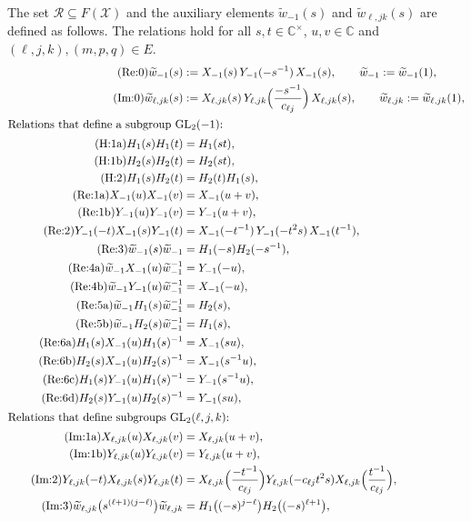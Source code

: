 \documentclass[11pt]{article}
\theoremstyle{definition}
\theoremstyle{remark}
\newcommand{\cX}{\mathcal{X}}
\newcommand{\cR}{\mathcal{R}}
\newcommand{\C}{\mathbb{C}}
\newcommand{\wt}{\widetilde{w}}
\begin{document}
The set $\cR\subseteq F(\cX)$ and the auxiliary elements $\wt_{-1}(s)$ and $\wt_{\ell,jk}(s)$ are defined as follows. The relations hold for all $s,t\in\C^\times$, $u,v\in\C$ and $(\ell,j,k),(m,p,q)\in E$.
\begin{align*}
\tag{Re:0} \wt_{-1}(s)&:=X_{-1}(s)\,Y_{-1}(-s^{-1})\,X_{-1}(s),\qquad \wt_{-1}:=\wt_{-1}(1),\\
\tag{Im:0} \wt_{\ell,jk}(s)&:=X_{\ell,jk}(s)\,Y_{\ell,jk}\Bigl(\frac{-s^{-1}}{c_{\ell j}}\Bigr)\,X_{\ell,jk}(s),\qquad \wt_{\ell,jk}:=\wt_{\ell,jk}(1),\\
\intertext{Relations that define a subgroup $\mathrm{GL}_2(-1)$:}
\tag{H:1a} H_1(s)H_1(t)&=H_1(st),\\
\tag{H:1b} H_2(s)H_2(t)&=H_2(st),\\
\tag{H:2} H_1(s)H_2(t)&=H_2(t)H_1(s),\\
\tag{Re:1a} X_{-1}(u)X_{-1}(v)&=X_{-1}(u+v),\\
\tag{Re:1b} Y_{-1}(u)Y_{-1}(v)&=Y_{-1}(u+v),\\
\tag{Re:2} Y_{-1}(-t)X_{-1}(s)Y_{-1}(t)&=X_{-1}(-t^{-1})\,Y_{-1}(-t^{2}s)\,X_{-1}(t^{-1}),\\
\tag{Re:3} \wt_{-1}(s)\wt_{-1}&=H_1(-s)H_2(-s^{-1}),\\
\tag{Re:4a} \wt_{-1}X_{-1}(u)\wt_{-1}^{-1}&=Y_{-1}(-u),\\
\tag{Re:4b} \wt_{-1}Y_{-1}(u)\wt_{-1}^{-1}&=X_{-1}(-u),\\
\tag{Re:5a} \wt_{-1}H_1(s)\wt_{-1}^{-1}&=H_2(s),\\
\tag{Re:5b} \wt_{-1}H_2(s)\wt_{-1}^{-1}&=H_1(s),\\
\tag{Re:6a} H_1(s)X_{-1}(u)H_1(s)^{-1}&=X_{-1}(su),\\
\tag{Re:6b} H_2(s)X_{-1}(u)H_2(s)^{-1}&=X_{-1}(s^{-1}u),\\
\tag{Re:6c} H_1(s)Y_{-1}(u)H_1(s)^{-1}&=Y_{-1}(s^{-1}u),\\
\tag{Re:6d} H_2(s)Y_{-1}(u)H_2(s)^{-1}&=Y_{-1}(su),\\
\intertext{Relations that define subgroups $\mathrm{GL}_2(\ell,j,k)$:}
\tag{Im:1a} X_{\ell,jk}(u)X_{\ell,jk}(v)&=X_{\ell,jk}(u+v),\\
\tag{Im:1b} Y_{\ell,jk}(u)Y_{\ell,jk}(v)&=Y_{\ell,jk}(u+v),\\
\tag{Im:2} Y_{\ell,jk}(-t)X_{\ell,jk}(s)Y_{\ell,jk}(t)&=X_{\ell,jk}\Bigl(\frac{-t^{-1}}{c_{\ell j}}\Bigr)Y_{\ell,jk}(-c_{\ell j}t^2s)X_{\ell,jk}\Bigl(\frac{t^{-1}}{c_{\ell j}}\Bigr),\\
\tag{Im:3} \wt_{\ell,jk}\bigl(s^{(\ell+1)(j-\ell)}\bigr)\wt_{\ell,jk}&=H_1\bigl((-s)^{j-\ell}\bigr)H_2\bigl((-s)^{\ell+1}\bigr),\\

\end{align*}
\end{document}
